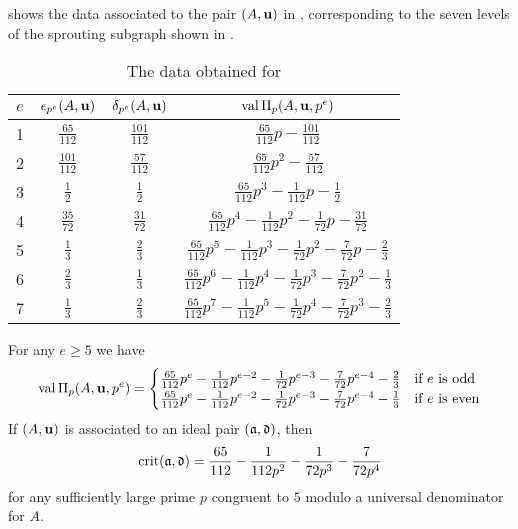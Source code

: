 \documentclass{amsart}
\begin{document}
\begin{example}
   \label{ex: new example.2}
    shows the data associated to the pair $(A,\mathbf{u})$ in , corresponding to the seven levels of the sprouting subgraph shown in .
   \begin{table}
      \begin{center}
         \begingroup
         \setlength{\tabcolsep}{8pt} %
         \renewcommand{\arraystretch}{1.4} %
         \begin{tabular}{cccc}
           \toprule
           $e$ & $\epsilon_{p^e}(A,\mathbf{u})$ & $\delta_{p^e}(A,\mathbf{u})$ & $\operatorname{val}\Pi_p(A,\mathbf{u},p^e)$ \\
           \midrule
           1 & $\frac{65}{112}$ & $\frac{101}{112}$ & $\frac{65}{112}p - \frac{101}{112}$\\
           2 & $\frac{101}{112}$ & $\frac{57}{112}$ & $\frac{65}{112}p^2 -\frac{57}{112}$ \\
           3 & $\frac{1}{2}$ & $\frac{1}{2}$ & $\frac{65}{112}p^3 - \frac{1}{112}p - \frac12$ \\
           4 & $\frac{35}{72}$ & $\frac{31}{72}$ & $\frac{65}{112}p^4 - \frac{1}{112}p^2 - \frac{1}{72}p - \frac{31}{72}$ \\
           5 & $\frac13$ & $\frac23$ & $\frac{65}{112}p^5 - \frac{1}{112}p^3 - \frac{1}{72}p^2 - \frac{7}{72}p -\frac23$ \\
           6 & $\frac23$ & $\frac13$ & $\frac{65}{112}p^6 - \frac{1}{112}p^4 - \frac{1}{72}p^3 - \frac{7}{72}p^2 -\frac13$ \\
           7 & $\frac13$ & $\frac23$ & $\frac{65}{112}p^7 - \frac{1}{112}p^5 - \frac{1}{72}p^4 - \frac{7}{72}p^3 -\frac23$ \\
           \bottomrule
         \end{tabular}
         \endgroup
      \end{center}
      \caption{The data obtained for }
      \label{table: new example data}
   \end{table}
   For any $e\ge 5$ we have
     \[
      \operatorname{val}\Pi_p(A,\mathbf{u},p^e) =
      \begin{cases}
         \frac{65}{112}p^e - \frac{1}{112}p^{e-2} - \frac{1}{72}p^{e-3} - \frac{7}{72}p^{e-4} - \frac23 & \text{if $e$ is odd}\\
         \frac{65}{112}p^e - \frac{1}{112}p^{e-2} - \frac{1}{72}p^{e-3} - \frac{7}{72}p^{e-4} - \frac13 & \text{if $e$ is even}
      \end{cases}
   \]
   If $(A,\mathbf{u})$ is associated to an ideal pair $(\mathfrak{a},\mathfrak{d})$, then
   \[\operatorname{crit}(\mathfrak{a},\mathfrak{d}) = \frac{65}{112} - \frac1{112 p^2} - \frac1{72 p^3} - \frac7{72 p^4} \]
   for any sufficiently large prime $p$ congruent to $5$ modulo a universal denominator for $A$.
\end{example}
\end{document}
